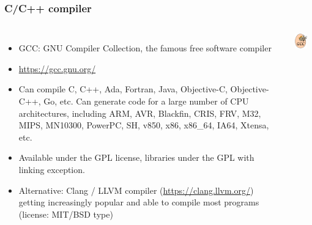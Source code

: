 \begin{frame}
  \frametitle{C/C++ compiler}
  \begin{columns}
    \begin{itemize}
    \item GCC: GNU Compiler Collection, the famous free software compiler
    \item \url{https://gcc.gnu.org/}
    \item Can compile C, C++, Ada, Fortran, Java, Objective-C,
      Objective-C++, Go, etc. Can generate code for a large number of CPU
      architectures, including ARM, AVR, Blackfin, CRIS, FRV, M32, MIPS,
      MN10300, PowerPC, SH, v850, x86, x86\_64, IA64, Xtensa, etc.
    \item Available under the GPL license, libraries under the GPL with
      linking exception.
    \item Alternative: Clang / LLVM compiler (\url{https://clang.llvm.org/})
      getting increasingly popular and able to compile most programs
      (license: MIT/BSD type)
    \end{itemize}
    \includegraphics[width=0.7\textwidth]{slides/sysdev-toolchains-definition/gcc.png}
  \end{columns}
\end{frame}


